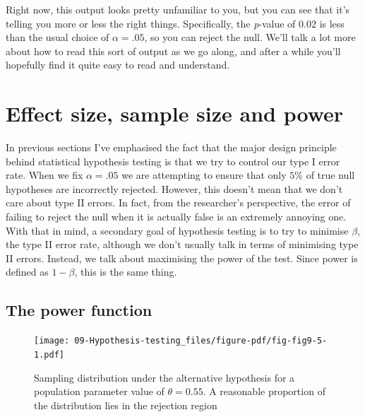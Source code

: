 \documentclass[
  a4paper,
]{book}
\begin{document}
Right now, this output looks pretty unfamiliar to you, but you can see
that it's telling you more or less the right things. Specifically, the
\emph{p}-value of \(0.02\) is less than the usual choice of
\(\alpha = .05\), so you can reject the null. We'll talk a lot more
about how to read this sort of output as we go along, and after a while
you'll hopefully find it quite easy to read and understand.

\hypertarget{sec-Effect-size-sample-size-and-power}{%
\section{Effect size, sample size and
power}\label{sec-Effect-size-sample-size-and-power}}

In previous sections I've emphasised the fact that the major design
principle behind statistical hypothesis testing is that we try to
control our type I error rate. When we fix \(\alpha = .05\) we are
attempting to ensure that only \(5\%\) of true null hypotheses are
incorrectly rejected. However, this doesn't mean that we don't care
about type II errors. In fact, from the researcher's perspective, the
error of failing to reject the null when it is actually false is an
extremely annoying one. With that in mind, a secondary goal of
hypothesis testing is to try to minimise \(\beta\), the type II error
rate, although we don't usually talk in terms of minimising type II
errors. Instead, we talk about maximising the power of the test. Since
power is defined as \(1 - \beta\), this is the same thing.

\hypertarget{the-power-function}{%
\subsection{The power function}\label{the-power-function}}

\begin{figure}

\texttt{[image: 09-Hypothesis-testing\_files/figure-pdf/fig-fig9-5-1.pdf]} \hfill{}

\caption{\label{fig-fig9-5}Sampling distribution under the alternative
hypothesis for a population parameter value of \(\theta = 0.55\). A
reasonable proportion of the distribution lies in the rejection region}

\end{figure}
\end{document}
